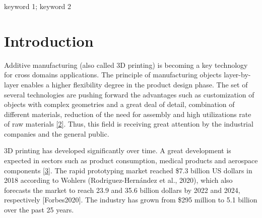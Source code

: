 \documentclass[conference,final,]{IEEEtran}
\begin{document}
\begin{IEEEkeywords}
keyword 1; keyword 2
\end{IEEEkeywords}




\maketitle


%
\IEEEpeerreviewmaketitle


\hypertarget{introduction}{%
\section{Introduction}\label{introduction}}

Additive manufacturing (also called 3D printing) is becoming a key
technology for cross domains applications. The principle of
manufacturing objects layer-by-layer enables a higher flexibility degree
in the product design phase. The set of several technologies are pushing
forward the advantages such as customization of objects with complex
geometries and a great deal of detail, combination of different
materials, reduction of the need for assembly and high utilizations rate
of raw materials \protect\hyperlink{ref-Xiao2014}{{[}2{]}}. Thus, this
field is receiving great attention by the industrial companies and the
general public.

3D printing has developed significantly over time. A great development
is expected in sectors such as product consumption, medical products and
aerospace components \protect\hyperlink{ref-Peng2018}{{[}3{]}}. The
rapid prototyping market reached \$7.3 billion US dollars in 2018
according to Wohlers (Rodriguez-Hernández et al., 2020), which also
forecasts the market to reach 23.9 and 35.6 billion dollars by 2022 and
2024, respectively {[}Forbes2020{]}. The industry has grown from \$295
million to 5.1 billion over the past 25 years.
\end{document}
